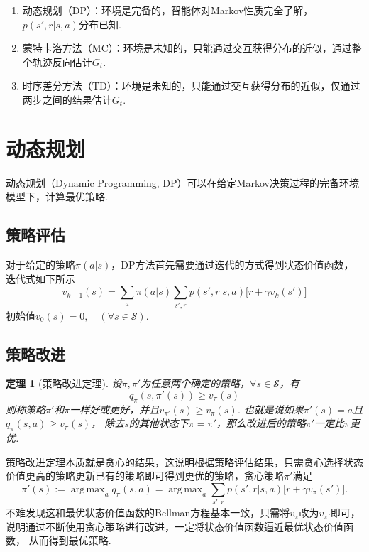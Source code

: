 \documentclass[12pt, a4paper, oneside]{ctexart}
\newtheorem{theorem}{定理}[section] %
\numberwithin{equation}{section}  %
\DeclareMathOperator*{\argmax}{arg\,max}  %
\let\geq=\geqslant %
\def\S{\mathcal{S}}         %
\begin{document}
\begin{enumerate}
    \item 动态规划（DP）：环境是完备的，智能体对Markov性质完全了解，$p(s',r|s,a)$分布已知.
    \item 蒙特卡洛方法（MC）：环境是未知的，只能通过交互获得分布的近似，通过整个轨迹反向估计$G_t$.
    \item 时序差分方法（TD）：环境是未知的，只能通过交互获得分布的近似，仅通过两步之间的结果估计$G_t$.
\end{enumerate}

\section{动态规划}
动态规划（Dynamic Programming, DP）可以在给定Markov决策过程的完备环境模型下，计算最优策略.

\subsection{策略评估}
对于给定的策略$\pi(a|s)$，DP方法首先需要通过迭代的方式得到状态价值函数，迭代式如下所示
\begin{equation*}
    v_{k+1}(s) = \sum_{a}\pi(a|s)\sum_{s',r}p(s',r|s,a)\big[r+\gamma v_k(s')\big]
\end{equation*}
初始值$v_0(s) = 0,\quad (\forall s\in \S)$.

\subsection{策略改进}
\begin{theorem}[策略改进定理]
    设$\pi,\pi'$为任意两个确定的策略，$\forall s\in \S$，有
    \begin{equation*}
        q_{\pi}(s,\pi'(s)) \geq v_\pi(s)
    \end{equation*}
    则称策略$\pi'$和$\pi$一样好或更好，并且$v_{\pi'}(s)\geq v_{\pi}(s)$. 也就是说如果$\pi'(s) = a$且$q_{\pi}(s,a) \geq v_{\pi}(s)$，
    除去$s$的其他状态下$\pi=\pi'$，那么改进后的策略$\pi'$一定比$\pi$更优.
\end{theorem}

策略改进定理本质就是贪心的结果，这说明根据策略评估结果，只需贪心选择状态价值更高的策略更新已有的策略即可得到更优的策略，贪心策略$\pi'$满足
\begin{equation*}
    \pi'(s):= \argmax_{a}q_{\pi}(s, a) = \argmax_{a}\sum_{s',r}p(s',r|s,a)\big[r+\gamma v_{\pi}(s')\big].
\end{equation*}
不难发现这和最优状态价值函数的Bellman方程基本一致，只需将$v_{\pi}$改为$v_{\pi'}$即可，说明通过不断使用贪心策略进行改进，一定将状态价值函数逼近最优状态价值函数，
从而得到最优策略.
\end{document}
